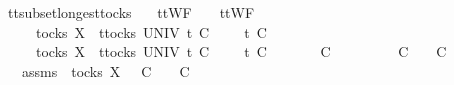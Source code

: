 \isamarkupfalse%
%
\endisatagproof
{\isafoldproof}%
%
\isadelimproof
\isanewline
%
\endisadelimproof
\isanewline
{}\isamarkupfalse%
\ tt{\isacharunderscore}subset{\isacharunderscore}longest{\isacharunderscore}tocks{\isacharcolon}\isanewline
\ \ \ {\isachardoublequoteopen}ttWF\ {\isacharparenleft}{\isasymrho}{\isacharprime}\ {\isacharat}\ {\isasymsigma}{\isacharprime}{\isacharparenright}{\isachardoublequoteclose}\ {\isachardoublequoteopen}ttWF\ {\isacharparenleft}{\isasymrho}\ {\isacharat}\ {\isasymsigma}{\isacharparenright}{\isachardoublequoteclose}\isanewline
\ \ \ {\isachardoublequoteopen}{\isasymrho}\ {\isasymin}\ tocks\ X{\isachardoublequoteclose}\ {\isachardoublequoteopen}{\isasymforall}\ t{\isasymin}tocks\ UNIV{\isachardot}\ t\ {\isasymle}\isactrlsub C\ {\isasymrho}\ {\isacharat}\ {\isasymsigma}\ {\isasymlongrightarrow}\ t\ {\isasymle}\isactrlsub C\ {\isasymrho}{\isachardoublequoteclose}\isanewline
\ \ \ {\isachardoublequoteopen}{\isasymrho}{\isacharprime}\ {\isasymin}\ tocks\ X{\isachardoublequoteclose}\ {\isachardoublequoteopen}{\isasymforall}\ t{\isasymin}tocks\ UNIV{\isachardot}\ t\ {\isasymle}\isactrlsub C\ {\isasymrho}{\isacharprime}\ {\isacharat}\ {\isasymsigma}{\isacharprime}\ {\isasymlongrightarrow}\ t\ {\isasymle}\isactrlsub C\ {\isasymrho}{\isacharprime}{\isachardoublequoteclose}\isanewline
\ \ \ {\isachardoublequoteopen}{\isasymrho}{\isacharprime}\ {\isacharat}\ {\isasymsigma}{\isacharprime}\ {\isasymsubseteq}\isactrlsub C\ {\isasymrho}\ {\isacharat}\ {\isasymsigma}{\isachardoublequoteclose}\ \ \isanewline
\ \ \ {\isachardoublequoteopen}{\isasymrho}{\isacharprime}\ {\isasymsubseteq}\isactrlsub C\ {\isasymrho}\ {\isasymand}\ {\isasymsigma}{\isacharprime}\ {\isasymsubseteq}\isactrlsub C\ {\isasymsigma}{\isachardoublequoteclose}\isanewline
%
\isadelimproof
%
\endisadelimproof
%
\isatagproof
{}\isamarkupfalse%
\ {\isacharminus}\isanewline
\ \ \isamarkupfalse%
\ {\isasymrho}{\isacharprime}{\isacharprime}\ \ {\isasymrho}{\isacharprime}{\isacharprime}{\isacharunderscore}assms{\isacharcolon}\ {\isachardoublequoteopen}{\isasymrho}{\isacharprime}{\isacharprime}{\isasymin}\ tocks\ X\ {\isasymand}\ {\isasymrho}{\isacharprime}{\isacharprime}\ {\isasymsubseteq}\isactrlsub C\ {\isasymrho}\ {\isasymand}\ {\isasymrho}{\isacharprime}{\isacharprime}\ {\isasymle}\isactrlsub C\ {\isasymrho}{\isacharprime}\ {\isacharat}\ {\isasymsigma}{\isacharprime}{\isachardoublequoteclose}\isanewline
